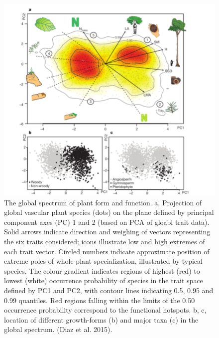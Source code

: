 \documentclass[12pt,oneside]{book}
\begin{document}
\begin{figure}

{\centering \includegraphics[width=0.8\linewidth]{figures/chap7/f77_PES} 

}

\caption{The global spectrum of plant form and function. a, Projection of global vascular plant species (dots) on the plane defined by principal component axes (PC) 1 and 2 (based on PCA of gloabl trait data). Solid arrows indicate direction and weighing of vectors representing the six traits considered; icons illustrate low and high extremes of each trait vector. Circled numbers indicate approximate position of extreme poles of whole-plant specialization, illustrated by typical species. The colour gradient indicates regions of highest (red) to lowest (white) occurrence probability of species in the trait space defined by PC1 and PC2, with contour lines indicating 0.5, 0.95 and 0.99 quantiles. Red regions falling within the limits of the 0.50 occurrence probability correspond to the functional hotspots. b, c, location of different growth-forms (b) and major taxa (c) in the global spectrum. (Diaz et al. 2015).}\label{fig:f77}
\end{figure}
\end{document}
